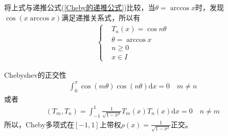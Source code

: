                 将上式与递推公式(\ref{Cheby的递推公式})比较，当$\theta = \arccos x$时，发现$\cos (x \arccos x)$满足递推关系式，所以有
                \begin{align*}
                    \left\{
                        \begin{aligned}
                            &T_n(x) = \cos n\theta\\
                            &\theta = \arccos x\\
                            &n \geqslant 0\\
                            &x \in I
                        \end{aligned}
                    \right.
                \end{align*}
                \par
                Chebyshev的正交性
                \begin{align*}
                \int _0^{\pi} \cos(m\theta) \cos(n\theta) \mathrm{d}x = 0 \quad m\neq n
                \end{align*}
                或者
                \begin{align*}
                    (T_m,T_n) = \int_{-1}^1 \frac{1}{\sqrt{1-x^2}} T_m(x) T_n(x) \mathrm{d}x = 0 \quad n\neq m
                \end{align*}
                所以，Cheby多项式在$[-1,1]$上带权$\rho (x) = \frac{1}{\sqrt{1-x^2}}$正交。

